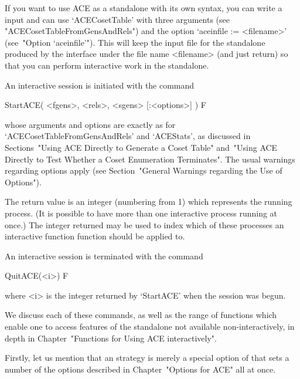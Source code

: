 
If you want to use ACE as a standalone with its own  syntax,  you  can
write a {\GAP} input and can use `ACECosetTable' with three  arguments
(see "ACECosetTableFromGensAndRels")  and  the  option  `aceinfile  :=
<filename>' (see~"Option `aceinfile'"). This will keep the input  file
for the {\ACE} standalone produced by the {\GAP} interface  under  the
file name <filename>  (and  just  return)  so  that  you  can  perform
interactive work in the standalone.


An interactive {\ACE} session is initiated with the command

\>StartACE( <fgens>, <rels>, <sgens> [:<options>] ) F

whose    arguments    and    options    are     exactly     as     for
`ACECosetTableFromGensAndRels'  and  `ACEStats',   as   discussed   in
Sections~"Using ACE Directly to Generate a Coset Table" and~"Using ACE
Directly to Test Whether a Coset Enumeration  Terminates".  The  usual
warnings  regarding  options  apply  (see  Section~"General   Warnings
regarding the Use of Options").

The return value is an integer (numbering from 1) which represents the
running process. (It is possible to have  more  than  one  interactive
process running at once.) The integer returned may be  used  to  index
which of these  processes  an  interactive  function  {\ACE}  function
should be applied to.

An interactive{\ACE} session is terminated with the command

\>QuitACE(<i>) F

where <i> is the integer returned by `StartACE' when the  session  was
begun.

We discuss each of these commands, as well as the range  of  functions
which enable one to access  features  of  the  {\ACE}  standalone  not
available non-interactively, in depth in Chapter~"Functions for  Using
ACE interactively".

Firstly, let us mention that an {\ACE} strategy is  merely  a  special
option of {\ACE} that sets  a  number  of  the  options  described  in
Chapter~"Options for ACE" all at once.

